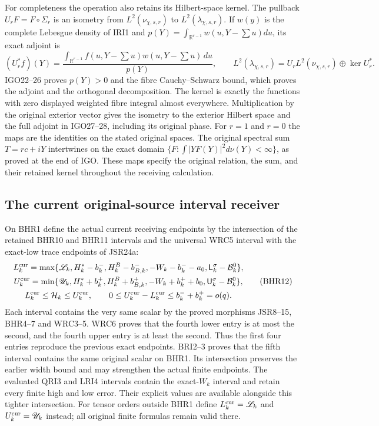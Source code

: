 \documentclass[11pt,a4paper]{article}
\begin{document}
For completeness the operation also retains its Hilbert-space
kernel. The pullback $U_rF=F\circ\Sigma_r$ is an isometry from
$L^2(\nu_{\chi,s,r})$ to $L^2(\lambda_{\chi,s,r})$. If
$w(y)$ is the complete Lebesgue density of IRI1 and
$p(Y)=\int_{\mathbb R^{r-1}}w(u,Y-\sum u)du$, its exact adjoint is
\[
 (U_r^*f)(Y)=\frac{\int_{\mathbb R^{r-1}}
                 f(u,Y-\sum u)w(u,Y-\sum u)\,du}{p(Y)},
 \qquad
 L^2(\lambda_{\chi,s,r})
       =U_rL^2(\nu_{\chi,s,r})\oplus\ker U_r^*.
 \tag{IRI5}
\]
IGO22--26 proves $p(Y)>0$ and the fibre Cauchy--Schwarz bound,
which proves the adjoint and the orthogonal decomposition. The
kernel is exactly the functions with zero displayed weighted fibre
integral almost everywhere. Multiplication by the original exterior
vector gives the isometry to the exterior Hilbert space and the
full adjoint in IGO27--28, including its original phase. For $r=1$
and $r=0$ the maps are the identities on the stated original spaces.
The original spectral sum $T=rc+iY$ intertwines on the exact domain
$\{F:\int |YF(Y)|^2d\nu(Y)<\infty\}$, as proved at the end of IGO.
These maps specify the original relation, the sum, and their retained
kernel throughout the receiving calculation.

\subsection{The current original-source interval receiver}
On BHR1 define the actual current receiving endpoints
by the intersection of the retained BHR10 and BHR11
intervals and the universal WRC5 interval with the
exact-low trace endpoints of JSR24a:
\[
\begin{gathered}
 L_k^{\rm cur}=\max\{\mathscr L_k,H_k^*-b_k^-,
 H_k^B-b_{B,k}^-,-W_k-b_k^--a_0,
                  \mathsf L_k^\sigma-\mathcal B_k^0\},\\
 U_k^{\rm cur}=\min\{\mathscr U_k,H_k^*+b_k^+,
 H_k^B+b_{B,k}^+,-W_k+b_k^++b_0,
                  \mathsf U_k^\sigma-\mathcal B_k^0\},\\
 L_k^{\rm cur}\leq\mathcal H_k\leq U_k^{\rm cur},
 \qquad0\leq U_k^{\rm cur}-L_k^{\rm cur}
                       \leq b_k^-+b_k^+=o(q).
\end{gathered}\tag{BHR12}
\]
Each interval contains the very same scalar by the
proved morphisms JSR8--15, BHR4--7 and WRC3--5.
WRC6 proves that the fourth lower entry is at most the
second, and the fourth upper entry is at least the second.
Thus the first four entries reproduce the previous exact
endpoints. BRI2--3 proves that the fifth interval contains the
same original scalar on BHR1. Its intersection preserves the
earlier width bound and may strengthen the actual finite endpoints.
The evaluated QRI3 and LRI4 intervals contain the exact-$W_k$
interval and retain every finite high and low error. Their explicit
values are available alongside this tighter intersection.
For tensor orders outside BHR1 define
$L_k^{\rm cur}=\mathscr L_k$ and
$U_k^{\rm cur}=\mathscr U_k$ instead; all original
finite formulas remain valid there.
\end{document}
